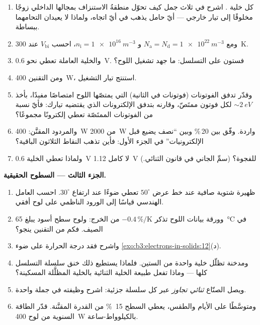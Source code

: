 \begin{problem}
\begin{enumerate}[resume]
  \item كل خلية . اشرح في ثلاث جمل
        كيف تحوّل منطقةُ الاستنزاف بمجالها الداخلي زوجًا مخلوقًا
        إلى تيار خارجي --- أيّ حامل يذهب في أيّ اتجاه، ولماذا لا يعيدان التحامهما ببساطة.
  \item ومع $N_{\text{a}} = N_{\text{d}} = \qty{1e22}{m^{-3}}$
        و $n_{\text{i}} = \qty{1e16}{m^{-3}}$، احسب
        $V_{\text{bi}}$ عند \qty{300}{K}.
  \item والخلية العاملة تعطي نحو \qty{0.6}{V}. فستون على
        التسلسل: ما جهد تشغيل اللوح؟
  \item ومن التقنين \qty{400}{W}، استنتج تيار
        التشغيل.
  \item وقدّر تدفق الفوتونات (فوتونات في الثانية) التي يمتصّها
        اللوح امتصاصًا مفيدًا، بأخذ $\sim\qty{2}{eV}$ لكل فوتون
        ممتَصّ، وقارنه بتدفق الإلكترونات الذي يقتضيه تيارك:
        فأيّ نسبة من الفوتونات الممتَصّة تعطي
        إلكترونًا مجموعًا؟
  \item والمردود المقنَّن: \qty{400}{W} من
        \qty{2000}{W} واردة. وفّق بين 20\,\% وبين ``نصف يضيع
        قبل الإلكترونيات'' في الجزء الأول: فأين تذهب النقاط
        الثلاثون الباقية؟
  \item ولماذا تعطي الخلية \qty{0.6}{V} لا كامل
        \qty{1.12}{V} للفجوة؟ (سمِّ الجاني في قانون
        الثنائي.)
\end{enumerate}

\medskip\noindent\textbf{الجزء الثالث --- السطوح الحقيقية.}

\begin{enumerate}[resume]
  \item ظهيرة شتوية صافية عند خط عرض $50^\circ$ تعطي
        ضوءًا عند ارتفاع $30^\circ$. احسب العامل الهندسي
        قياسًا إلى الورود الناظمي على لوح
        أفقي.
  \item وورقة بيانات اللوح تذكر $-0.4\,\%/\text{K}$ من الخرج:
        ولوح سطح أسود يبلغ \qty{65}{\celsius} في الصيف.
        فكم من التقنين ينجو؟
  \item واشرح فقد درجة الحرارة على ضوء
        \cref{exo:b3:electrons-in-solids:12}(د).
  \item ومدخنة تظلّل خلية واحدة من الستين. فلماذا يستطيع ذلك
        خنق سلسلة التسلسل كلها --- وماذا تفعل طبيعة
        الخلية الثنائية بالخلية المظلَّلة المسكينة؟
  \item ويصل الصنّاع \emph{ثنائي تجاوز} عبر كل
        سلسلة جزئية: اشرح وظيفته في جملة واحدة.
  \item ومتوسَّطًا على الأيام والطقس، يعطي السطح
        \qty{15}{\percent} من القدرة المقنَّنة. قدّر الطاقة السنوية
        من لوح \qty{400}{W} بالكيلوواط-ساعة.
\end{enumerate}


\end{problem}
